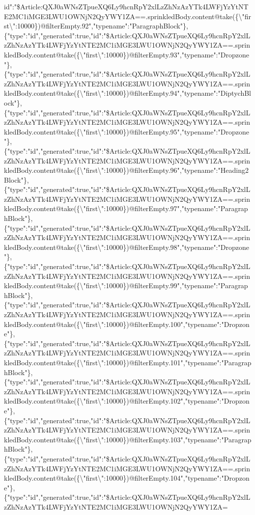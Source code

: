 id":"\$Article:QXJ0aWNsZTpueXQ6Ly9hcnRpY2xlLzZhNzAzYTk4LWFjYzYtNTE2MC1iMGE3LWU1OWNjN2QyYWY1ZA==.sprinkledBody.content@take(\{\textbackslash{}"first\textbackslash{}":10000\})@filterEmpty.92","typename":"ParagraphBlock"\},\{"type":"id","generated":true,"id":"\$Article:QXJ0aWNsZTpueXQ6Ly9hcnRpY2xlLzZhNzAzYTk4LWFjYzYtNTE2MC1iMGE3LWU1OWNjN2QyYWY1ZA==.sprinkledBody.content@take(\{\textbackslash{}"first\textbackslash{}":10000\})@filterEmpty.93","typename":"Dropzone"\},\{"type":"id","generated":true,"id":"\$Article:QXJ0aWNsZTpueXQ6Ly9hcnRpY2xlLzZhNzAzYTk4LWFjYzYtNTE2MC1iMGE3LWU1OWNjN2QyYWY1ZA==.sprinkledBody.content@take(\{\textbackslash{}"first\textbackslash{}":10000\})@filterEmpty.94","typename":"DiptychBlock"\},\{"type":"id","generated":true,"id":"\$Article:QXJ0aWNsZTpueXQ6Ly9hcnRpY2xlLzZhNzAzYTk4LWFjYzYtNTE2MC1iMGE3LWU1OWNjN2QyYWY1ZA==.sprinkledBody.content@take(\{\textbackslash{}"first\textbackslash{}":10000\})@filterEmpty.95","typename":"Dropzone"\},\{"type":"id","generated":true,"id":"\$Article:QXJ0aWNsZTpueXQ6Ly9hcnRpY2xlLzZhNzAzYTk4LWFjYzYtNTE2MC1iMGE3LWU1OWNjN2QyYWY1ZA==.sprinkledBody.content@take(\{\textbackslash{}"first\textbackslash{}":10000\})@filterEmpty.96","typename":"Heading2Block"\},\{"type":"id","generated":true,"id":"\$Article:QXJ0aWNsZTpueXQ6Ly9hcnRpY2xlLzZhNzAzYTk4LWFjYzYtNTE2MC1iMGE3LWU1OWNjN2QyYWY1ZA==.sprinkledBody.content@take(\{\textbackslash{}"first\textbackslash{}":10000\})@filterEmpty.97","typename":"ParagraphBlock"\},\{"type":"id","generated":true,"id":"\$Article:QXJ0aWNsZTpueXQ6Ly9hcnRpY2xlLzZhNzAzYTk4LWFjYzYtNTE2MC1iMGE3LWU1OWNjN2QyYWY1ZA==.sprinkledBody.content@take(\{\textbackslash{}"first\textbackslash{}":10000\})@filterEmpty.98","typename":"Dropzone"\},\{"type":"id","generated":true,"id":"\$Article:QXJ0aWNsZTpueXQ6Ly9hcnRpY2xlLzZhNzAzYTk4LWFjYzYtNTE2MC1iMGE3LWU1OWNjN2QyYWY1ZA==.sprinkledBody.content@take(\{\textbackslash{}"first\textbackslash{}":10000\})@filterEmpty.99","typename":"ParagraphBlock"\},\{"type":"id","generated":true,"id":"\$Article:QXJ0aWNsZTpueXQ6Ly9hcnRpY2xlLzZhNzAzYTk4LWFjYzYtNTE2MC1iMGE3LWU1OWNjN2QyYWY1ZA==.sprinkledBody.content@take(\{\textbackslash{}"first\textbackslash{}":10000\})@filterEmpty.100","typename":"Dropzone"\},\{"type":"id","generated":true,"id":"\$Article:QXJ0aWNsZTpueXQ6Ly9hcnRpY2xlLzZhNzAzYTk4LWFjYzYtNTE2MC1iMGE3LWU1OWNjN2QyYWY1ZA==.sprinkledBody.content@take(\{\textbackslash{}"first\textbackslash{}":10000\})@filterEmpty.101","typename":"ParagraphBlock"\},\{"type":"id","generated":true,"id":"\$Article:QXJ0aWNsZTpueXQ6Ly9hcnRpY2xlLzZhNzAzYTk4LWFjYzYtNTE2MC1iMGE3LWU1OWNjN2QyYWY1ZA==.sprinkledBody.content@take(\{\textbackslash{}"first\textbackslash{}":10000\})@filterEmpty.102","typename":"Dropzone"\},\{"type":"id","generated":true,"id":"\$Article:QXJ0aWNsZTpueXQ6Ly9hcnRpY2xlLzZhNzAzYTk4LWFjYzYtNTE2MC1iMGE3LWU1OWNjN2QyYWY1ZA==.sprinkledBody.content@take(\{\textbackslash{}"first\textbackslash{}":10000\})@filterEmpty.103","typename":"ParagraphBlock"\},\{"type":"id","generated":true,"id":"\$Article:QXJ0aWNsZTpueXQ6Ly9hcnRpY2xlLzZhNzAzYTk4LWFjYzYtNTE2MC1iMGE3LWU1OWNjN2QyYWY1ZA==.sprinkledBody.content@take(\{\textbackslash{}"first\textbackslash{}":10000\})@filterEmpty.104","typename":"Dropzone"\},\{"type":"id","generated":true,"id":"\$Article:QXJ0aWNsZTpueXQ6Ly9hcnRpY2xlLzZhNzAzYTk4LWFjYzYtNTE2MC1iMGE3LWU1OWNjN2QyYWY1ZA=